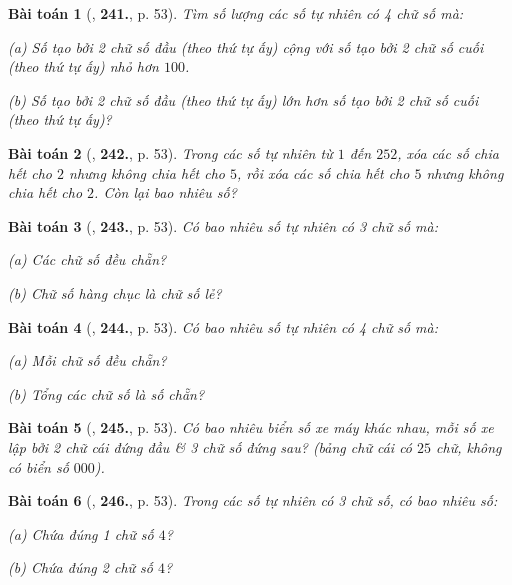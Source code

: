 \documentclass{article}
\numberwithin{equation}{section}
\newtheorem{baitoan}{Bài toán}
\begin{document}
\begin{baitoan}[\cite{Binh_Toan_6_tap_1}, \textbf{241.}, p. 53]
	Tìm số lượng các số tự nhiên có 4 chữ số mà:
	\begin{enumerate*}
		\item[(a)] Số tạo bởi 2 chữ số đầu (theo thứ tự ấy) cộng với số tạo bởi 2 chữ số cuối (theo thứ tự ấy) nhỏ hơn $100$.
		\item[(b)] Số tạo bởi 2 chữ số đầu (theo thứ tự ấy) lớn hơn số tạo bởi 2 chữ số cuối (theo thứ tự ấy)?
	\end{enumerate*}
\end{baitoan}

\begin{baitoan}[\cite{Binh_Toan_6_tap_1}, \textbf{242.}, p. 53]
	Trong các số tự nhiên từ $1$ đến $252$, xóa các số chia hết cho $2$ nhưng không chia hết cho $5$, rồi xóa các số chia hết cho $5$ nhưng không chia hết cho $2$. Còn lại bao nhiêu số?
\end{baitoan}

\begin{baitoan}[\cite{Binh_Toan_6_tap_1}, \textbf{243.}, p. 53]
	Có bao nhiêu số tự nhiên có 3 chữ số mà:
	\begin{enumerate*}
		\item[(a)] Các chữ số đều chẵn?
		\item[(b)] Chữ số hàng chục là chữ số lẻ?
	\end{enumerate*}
\end{baitoan}

\begin{baitoan}[\cite{Binh_Toan_6_tap_1}, \textbf{244.}, p. 53]
	Có bao nhiêu số tự nhiên có 4 chữ số mà:
	\begin{enumerate*}
		\item[(a)] Mỗi chữ số đều chẵn?
		\item[(b)] Tổng các chữ số là số chẵn?
	\end{enumerate*}
\end{baitoan}

\begin{baitoan}[\cite{Binh_Toan_6_tap_1}, \textbf{245.}, p. 53]
	Có bao nhiêu biển số xe máy khác nhau, mỗi số xe lập bởi 2 chữ cái đứng đầu \& 3 chữ số đứng sau? (bảng chữ cái có $25$ chữ, không có biển số $000$).
\end{baitoan}

\begin{baitoan}[\cite{Binh_Toan_6_tap_1}, \textbf{246.}, p. 53]
	Trong các số tự nhiên có 3 chữ số, có bao nhiêu số:
	\begin{enumerate*}
		\item[(a)] Chứa đúng 1 chữ số $4$?
		\item[(b)] Chứa đúng 2 chữ số $4$?
	\end{enumerate*}
\end{baitoan}
\end{document}

